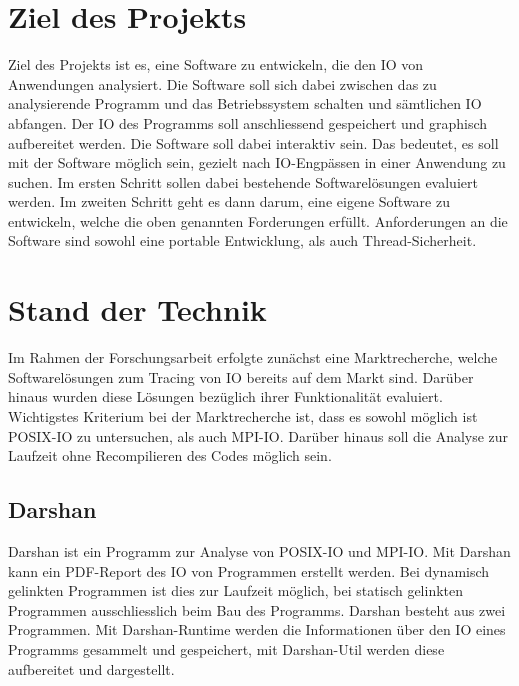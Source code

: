 
\chapter{Ziel des Projekts}
\label{sec:grundl}
Ziel des Projekts ist es, eine Software zu entwickeln, die den IO von Anwendungen analysiert. Die Software soll sich dabei zwischen das zu analysierende Programm und das Betriebssystem schalten und s\"amtlichen IO abfangen. Der IO des Programms soll anschliessend gespeichert und graphisch aufbereitet werden. Die Software soll dabei interaktiv sein. Das bedeutet, es soll mit der Software m\"oglich sein, gezielt nach IO-Engp\"assen in einer Anwendung zu suchen.\newline\newline
Im ersten Schritt sollen dabei bestehende Softwarel\"osungen evaluiert werden. Im zweiten Schritt geht es dann darum, eine eigene Software zu entwickeln, welche die oben genannten Forderungen erf\"ullt. Anforderungen an die Software sind sowohl eine portable Entwicklung, als auch Thread-Sicherheit.

\chapter{Stand der Technik}
\label{sec:tech}
Im Rahmen der Forschungsarbeit erfolgte zun\"achst eine Marktrecherche, welche Softwarel\"osungen zum Tracing von IO bereits auf dem Markt sind. Dar\"uber hinaus wurden diese L\"osungen bez\"uglich ihrer Funktionalit\"at evaluiert. Wichtigstes Kriterium bei der Marktrecherche ist, dass es sowohl m\"oglich ist POSIX-IO zu untersuchen, als auch MPI-IO. Dar\"uber hinaus soll die Analyse zur Laufzeit ohne Recompilieren des Codes m\"oglich sein.
\section{Darshan}
Darshan ist ein Programm zur Analyse von POSIX-IO und MPI-IO. Mit Darshan kann ein PDF-Report des IO von Programmen erstellt werden. Bei dynamisch gelinkten Programmen ist dies zur Laufzeit m\"oglich, bei statisch gelinkten Programmen ausschliesslich beim Bau des Programms.\newline
Darshan besteht aus zwei Programmen. Mit Darshan-Runtime werden die Informationen \"uber den IO eines Programms gesammelt und gespeichert, mit Darshan-Util werden diese aufbereitet und dargestellt.

